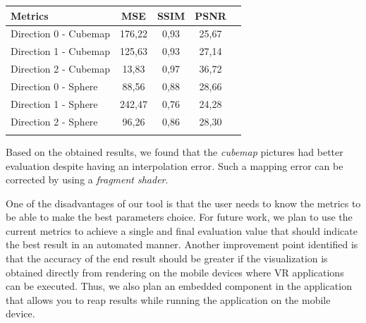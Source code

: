 \documentclass[12pt]{article}
\begin{document}
\begin{tabular}{l*{3}{c}r}
Metrics               & MSE & SSIM & PSNR \\
\hline
Direction 0 - Cubemap & 176,22 & 0,93 & 25,67 \\
Direction 1 - Cubemap & 125,63 & 0,93 & 27,14 \\
Direction 2 - Cubemap & 13,83 & 0,97 & 36,72 \\
Direction 0 - Sphere  & 88,56 & 0,88 & 28,66 \\
Direction 1 - Sphere  & 242,47 & 0,76 & 24,28 \\
Direction 2 - Sphere  & 96,26 & 0,86 & 28,30 \\
\label{tab:metrics_results}
\end{tabular}

Based on the obtained results, we found that the \textit{cubemap} pictures had better evaluation despite having an interpolation error. Such a mapping error can be corrected by using a \textit{fragment shader}. 

One of the disadvantages of our tool is that the user needs to know the metrics to be able to make the best parameters choice. For future work, we plan to use the current metrics to achieve a single and final evaluation value that should indicate the best result in an automated manner. Another improvement point identified is that the accuracy of the end result should be greater if the visualization is obtained directly from rendering on the mobile devices where VR applications can be executed. Thus, we also plan an embedded component in the application that allows you to reap results while running the application on the mobile device.



\end{document}
